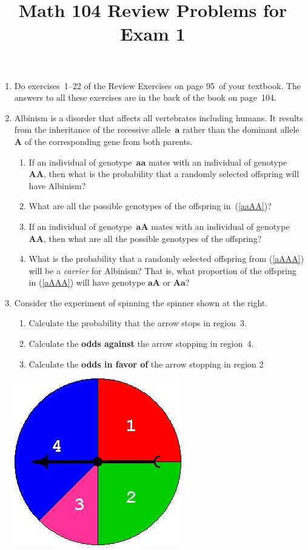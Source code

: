 \documentclass[12pt]{article}
\author{}\date{}
\title{Math 104 Review Problems for Exam 1}\author{}
\begin{document}
\maketitle
\pagestyle{empty}
\begin{enumerate}
\item Do exercises~1--22 of the Review Exercises
on page 95~of your textbook.
The answers to all these exercises are in the
back of the book on page~104.
\item Albinism is a disorder that affects all vertebrates
including humans. It results from the inheritance
of the recessive allele~$\mathbold{a}$ rather than the dominant
allele~$\mathbold{A}$
of the corresponding gene from both parents.
\begin{enumerate}
\item\label{aaAA} If an individual of
genotype~$\mathbold{aa}$ mates with
an individual of genotype~$\mathbold{AA}$,
then what is the probability
that a randomly selected offspring will have Albinism?
\item What are all the possible genotypes of the offspring
in~(\ref{aaAA})?
\item\label{aAAA} If an individual of
genotype~$\mathbold{aA}$ mates with
an individual of genotype~$\mathbold{AA}$, then
what are all the possible genotypes of the offspring?
\item What is the probability that a randomly selected
offspring from (\ref{aAAA})
will be a {\em carrier} for Albinism? That is,
what proportion of the offspring in  (\ref{aAAA})
will have genotype $\mathbold{aA}$ or $\mathbold{Aa}$?
\end{enumerate}

\item\label{Spinner}\begin{multicols}{2}
Consider the experiment of spinning the spinner
shown at the right.
\begin{enumerate}
\item Calculate the probability that the arrow stops
in region~3.
\item Calculate the {\bf odds against} the arrow stopping
in region~4.
\item Calculate the {\bf odds in favor of} the arrow
stopping in region 2
\end{enumerate}
\includegraphics[scale=.5]{R1Spinner}
\end{multicols}


\end{enumerate}
\end{document}
